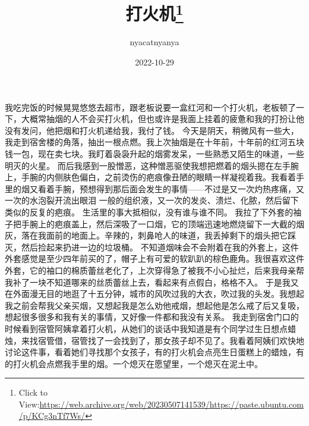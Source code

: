 \documentclass{article}
\title{打火机\footnote{Click to View:\url{https://web.archive.org/web/20230507141539/https://paste.ubuntu.com/p/KCg3nTf7Ws/}}}
\author{nyacatnyanya}
\date{2022-10-29}
\begin{document}

\maketitle


\Large

﻿我吃完饭的时候晃晃悠悠去超市，跟老板说要一盒红河和一个打火机，老板顿了一下，大概常抽烟的人不会买打火机，但也或许是我面上挂着的疲惫和我的打扮让他没有发问，他把烟和打火机递给我，我付了钱。
今天是阴天，稍微风有一些大，我走到宿舍楼的角落，抽出一根点燃。我上次抽烟是在十年前，十年前的红河五块钱一包，现在卖七块。我盯着袅袅升起的烟雾发呆，一些熟悉又陌生的味道，一些明灭的火星。
而后我感到一股憎恶，这种憎恶驱使我想把燃着的烟头摁在左手腕上，手腕的内侧肤色偏白，之前烫伤的疤痕像丑陋的眼睛一样凝视着我。我看着手里的烟又看着手腕，预想得到那后面会发生的事情——不过是又一次灼热疼痛，又一次的水泡裂开流出眼泪
\newpage
一般的组织液，又一次的发炎、溃烂、化脓，然后留下类似的反复的疤痕。
生活里的事大抵相似，没有谁与谁不同。
我拉了下外套的袖子把手腕上的疤痕盖上，然后深吸了一口烟，它的顶端迅速地燃烧留下一大截的烟灰，落在我面前的地面上。辛辣的，刺鼻呛人的味道，我丢掉剩下的烟头把它踩灭，然后捡起来扔进一边的垃圾桶。
不知道烟味会不会附着在我的外套上，这件外套感觉是至少四年前买的了，帽子上有可爱的软趴趴的棕色鹿角。我很喜欢这件外套，它的袖口的棉质蕾丝老化了，上次穿得急了被我不小心扯烂，后来我母亲帮我补了一块不知道哪来的丝质蕾丝上去，看起来有点假白，格格不入。
于是我又在外面漫无目的地逛了十五分钟，城市的风吹过我的大衣，吹过我的头发。我想起我之前会帮我父亲买烟，又想起我是怎么劝他戒烟，想起他是怎么戒了后又复吸，想起很多很多和我有关的事情，又好像一件都和我没有关系。
我走到宿舍门口的时候看到宿管阿姨拿着打火机，从她们的谈话中我知道是有个同学过生日想点蜡
\newpage
烛，来找宿管借，宿管找了一会找到了，那女孩子却不见了。我看着阿姨们欢快地讨论这件事，看着她们寻找那个女孩子，有的打火机会点亮生日蛋糕上的蜡烛，有的打火机会点燃我手里的烟。一个熄灭在愿望里，一个熄灭在泥土中。
\end{document}
